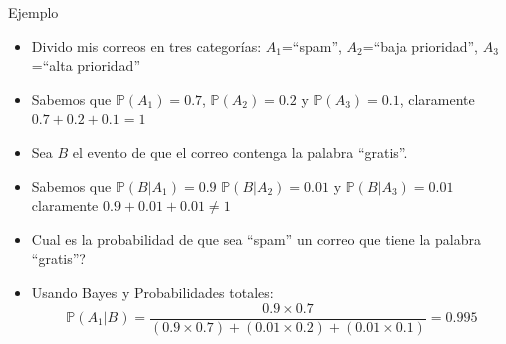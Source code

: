 \documentclass[handout]{beamer}
\begin{document}
\begin{frame}{Ejemplo}
\scriptsize{
\begin{itemize}
 \item Divido mis correos en tres categorías: $A_1$=``spam'', $A_2$=``baja prioridad'', $A_3$=``alta prioridad''
 \item Sabemos que $\mathbb{P}(A_1)=0.7$, $\mathbb{P}(A_2)=0.2$ y $\mathbb{P}(A_3)=0.1$, claramente $0.7+0.2+0.1=1$
 \item Sea $B$ el evento de que el correo contenga la palabra ``gratis''.
 \item Sabemos que $\mathbb{P}(B|A_1)=0.9$ $\mathbb{P}(B|A_2)=0.01$ y $\mathbb{P}(B|A_3)=0.01$ claramente $0.9+0.01+0.01 \neq 1$
 \item Cual es la probabilidad de que sea ``spam'' un correo que tiene la palabra ``gratis''?
 \item Usando Bayes y Probabilidades totales:
 \begin{displaymath}
  \mathbb{P}(A_1|B) = \frac{0.9 \times 0.7}{(0.9 \times 0.7) + (0.01 \times 0.2) + (0.01 \times 0.1)} = 0.995
 \end{displaymath}



\end{itemize}




} 
\end{frame}
\end{document}
